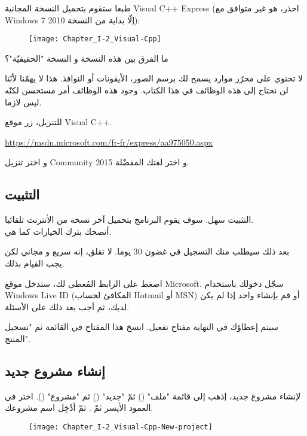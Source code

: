 طبعا ستقوم بتحميل النسخة المجانية
\textenglish{Visual C++ Express}
(احذر، هو غير متوافق مع
\textenglish{Windows 7}
إلّا بداية من النسخة 2010):

\begin{figure}[H]
	\centering
	\texttt{[image: Chapter\_I-2\_Visual-Cpp]}
\end{figure}

\begin{question}
ما الفرق بين هذه النسخة و النسخة "الحقيقيّة"؟
\end{question}

لا تحتوي على محرّر موارد يسمح لك برسم الصور، الأيقونات أو النوافذ. هذا لا يهمّنا لأنّنا لن نحتاج إلى هذه الوظائف في هذا الكتاب. وجود هذه الوظائف أمر مستحسن لكنّه ليس لازما.

للتنزيل، زر موقع
\textenglish{Visual C++}.

\url{https://msdn.microsoft.com/fr-fr/express/aa975050.aspx}

و اختر تنزيل
\textenglish{Community 2015}
و اختر لغتك المفضّلة.

\subsection{التثبيت}

التثبيت سهل. سوف يقوم البرنامج بتحميل آخر نسخة من الأنترنت تلقائيا.\\
أنصحك بترك الخيارات كما هي.

بعد ذلك سيطلب منك التسجيل في غضون 30 يوما. لا تقلق، إنه سريع و مجاني لكن يجب القيام بذلك.

اضغط على الرابط المُعطى لك، ستدخل موقع
\textenglish{Microsoft}.
سجّل دخولك باستخدام
\textenglish{Windows Live ID}
(المكافئ لحساب
\textenglish{Hotmail}
أو
\textenglish{MSN})
أو قم بإنشاء واحد إذا لم يكن لديك، ثم أجب بعد ذلك على الأسئلة.

سيتم إعطاؤك في النهاية مفتاح تفعيل. انسخ هذا المفتاح في القائمة
ثم
"تسجيل المنتج".

\subsection{إنشاء مشروع جديد}

لإنشاء مشروع جديد، إذهب إلى قائمة
"ملف"
()
ثمّ
"جديد"
()
ثم
"مشروع"
().
اختر
في العمود الأيسر ثمّ
.
ثمّ أدْخِل اسم مشروعك.

\begin{figure}[H]
	\centering
	\texttt{[image: Chapter\_I-2\_Visual-Cpp-New-project]}
\end{figure}

